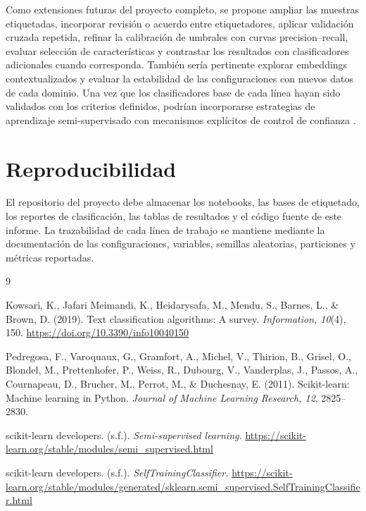 \documentclass[12pt,a4paper]{article}
\begin{document}
Como extensiones futuras del proyecto completo, se propone ampliar las muestras etiquetadas, incorporar revisión o acuerdo entre etiquetadores, aplicar validación cruzada repetida, refinar la calibración de umbrales con curvas precision--recall, evaluar selección de características y contrastar los resultados con clasificadores adicionales cuando corresponda. También sería pertinente explorar embeddings contextualizados y evaluar la estabilidad de las configuraciones con nuevos datos de cada dominio. Una vez que los clasificadores base de cada línea hayan sido validados con los criterios definidos, podrían incorporarse estrategias de aprendizaje semi-supervisado con mecanismos explícitos de control de confianza \cite{sklearnsemi,sklearnselftraining}.

\section{Reproducibilidad}

El repositorio del proyecto debe almacenar los notebooks, las bases de etiquetado, los reportes de clasificación, las tablas de resultados y el código fuente de este informe. La trazabilidad de cada línea de trabajo se mantiene mediante la documentación de las configuraciones, variables, semillas aleatorias, particiones y métricas reportadas. 
\begin{thebibliography}{9}

Kowsari, K., Jafari Meimandi, K., Heidarysafa, M., Mendu, S., Barnes, L., \& Brown, D. (2019).
\newblock Text classification algorithms: A survey.
\newblock \textit{Information, 10}(4), 150.
\newblock \url{https://doi.org/10.3390/info10040150}

Pedregosa, F., Varoquaux, G., Gramfort, A., Michel, V., Thirion, B., Grisel, O., Blondel, M., Prettenhofer, P., Weiss, R., Dubourg, V., Vanderplas, J., Passos, A., Cournapeau, D., Brucher, M., Perrot, M., \& Duchesnay, E. (2011).
\newblock Scikit-learn: Machine learning in Python.
\newblock \textit{Journal of Machine Learning Research, 12}, 2825--2830.

scikit-learn developers. (s.f.).
\newblock \textit{Semi-supervised learning.}
\newblock \url{https://scikit-learn.org/stable/modules/semi_supervised.html}

scikit-learn developers. (s.f.).
\newblock \textit{SelfTrainingClassifier.}
\newblock \url{https://scikit-learn.org/stable/modules/generated/sklearn.semi_supervised.SelfTrainingClassifier.html}

\end{thebibliography}
\end{document}
